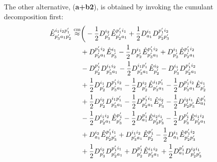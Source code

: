 \documentclass[aip,onecolumn,preprint]{revtex4-1}
\begin{document}
The other alternative, ({\bf a+b2}), is obtained by invoking the cumulant decomposition first:
\begin{align}
\hat{E}_{p^{\prime}_{3}a_{1}p^{\prime}_{2}}^{i_1 i_2 p^{\prime}_1} \overset{\rm cm}{\approx}&  \bigg( - {{{\frac{1}{2}}}{D^{{i_2}}_{{p^{\prime}_3}}}{\hat{E}^{{p^{\prime}_1}{i_1}}_{{p^{\prime}_2}{a_1}}}} + {{{\frac{1}{2}}}{D^{{i_1}}_{{a_1}}}{D^{{p^{\prime}_1}{i_2}}_{{p^{\prime}_2}{p^{\prime}_3}}}} \nonumber \\
  & + {{D^{{p^{\prime}_1}{i_2}}_{{p^{\prime}_2}{a_1}}}{\hat{E}^{{i_1}}_{{p^{\prime}_3}}}} - {{{\frac{1}{2}}}{D^{{i_1}}_{{p^{\prime}_2}}}{\hat{E}^{{p^{\prime}_1}{i_2}}_{{p^{\prime}_3}{a_1}}}} + {{D^{{i_1}}_{{p^{\prime}_3}}}{\hat{E}^{{p^{\prime}_1}{i_2}}_{{p^{\prime}_2}{a_1}}}} \nonumber \\
  & - {{D^{{p^{\prime}_1}}_{{p^{\prime}_2}}}{D^{{i_1}{i_2}}_{{p^{\prime}_3}{a_1}}}} - {{{\frac{1}{2}}}{D^{{i_1}{p^{\prime}_1}}_{{p^{\prime}_3}{a_1}}}{\hat{E}^{{i_2}}_{{p^{\prime}_2}}}} - {{D^{{i_1}}_{{p^{\prime}_3}}}{D^{{p^{\prime}_1}{i_2}}_{{p^{\prime}_2}{a_1}}}} \nonumber \\
  & + {{{\frac{1}{2}}}{D^{{i_1}}_{{p^{\prime}_2}}}{D^{{p^{\prime}_1}{i_2}}_{{p^{\prime}_3}{a_1}}}} - {{{\frac{1}{2}}}{D^{{i_2}}_{{p^{\prime}_2}}}{\hat{E}^{{i_1}{p^{\prime}_1}}_{{p^{\prime}_3}{a_1}}}} - {{{\frac{1}{2}}}{D^{{p^{\prime}_1}{i_2}}_{{p^{\prime}_3}{a_1}}}{\hat{E}^{{i_1}}_{{p^{\prime}_2}}}} \nonumber \\
  & + {{{\frac{1}{2}}}{D^{{i_2}}_{{p^{\prime}_2}}}{D^{{i_1}{p^{\prime}_1}}_{{p^{\prime}_3}{a_1}}}} - {{{\frac{1}{2}}}{D^{{p^{\prime}_1}{i_1}}_{{p^{\prime}_2}{a_1}}}{\hat{E}^{{i_2}}_{{p^{\prime}_3}}}} - {{{\frac{1}{2}}}{D^{{i_2}{i_1}}_{{p^{\prime}_2}{p^{\prime}_3}}}{\hat{E}^{{p^{\prime}_1}}_{{a_1}}}} \nonumber \\
  & - {{{\frac{1}{2}}}{D^{{i_1}{i_2}}_{{p^{\prime}_2}{a_1}}}{\hat{E}^{{p^{\prime}_1}}_{{p^{\prime}_3}}}} - {{{\frac{1}{2}}}{D^{{p^{\prime}_1}}_{{a_1}}}{\hat{E}^{{i_2}{i_1}}_{{p^{\prime}_2}{p^{\prime}_3}}}} - {{{\frac{1}{2}}}{D^{{p^{\prime}_1}}_{{p^{\prime}_3}}}{\hat{E}^{{i_1}{i_2}}_{{p^{\prime}_2}{a_1}}}} \nonumber \\
  & + {{D^{{i_2}}_{{a_1}}}{\hat{E}^{{p^{\prime}_1}{i_1}}_{{p^{\prime}_2}{p^{\prime}_3}}}} + {{D^{{i_1}{i_2}}_{{p^{\prime}_3}{a_1}}}{\hat{E}^{{p^{\prime}_1}}_{{p^{\prime}_2}}}} - {{{\frac{1}{2}}}{D^{{i_1}}_{{a_1}}}{\hat{E}^{{p^{\prime}_1}{i_2}}_{{p^{\prime}_2}{p^{\prime}_3}}}} \nonumber \\
  & + {{{\frac{1}{2}}}{D^{{i_2}}_{{p^{\prime}_3}}}{D^{{p^{\prime}_1}{i_1}}_{{p^{\prime}_2}{a_1}}}} + {{D^{{p^{\prime}_1}}_{{p^{\prime}_2}}}{\hat{E}^{{i_1}{i_2}}_{{p^{\prime}_3}{a_1}}}} + {{{\frac{1}{2}}}{D^{{p^{\prime}_1}}_{{a_1}}}{D^{{i_2}{i_1}}_{{p^{\prime}_2}{p^{\prime}_3}}}} \nonumber \\

\end{align}
\end{document}
